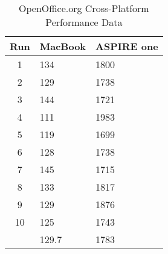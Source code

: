 \begin{table}
  \begin{center}
  \begin{tabular}{| c | l | l |}
    \hline
    Run  & MacBook & ASPIRE one \\ \hline
    1    & 134     & 1800       \\ \hline
    2    & 129     & 1738       \\ \hline
    3    & 144     & 1721       \\ \hline
    4    & 111     & 1983       \\ \hline
    5    & 119     & 1699       \\ \hline
    6    & 128     & 1738       \\ \hline
    7    & 145     & 1715       \\ \hline
    8    & 133     & 1817       \\ \hline
    9    & 129     & 1876       \\ \hline
    10   & 125     & 1743       \\ \hline
         & 129.7   & 1783       \\
    \hline
  \end{tabular}
  \caption{OpenOffice.org Cross-Platform Performance Data}
  \label{ooCp}
  \end{center}
\end{table}
